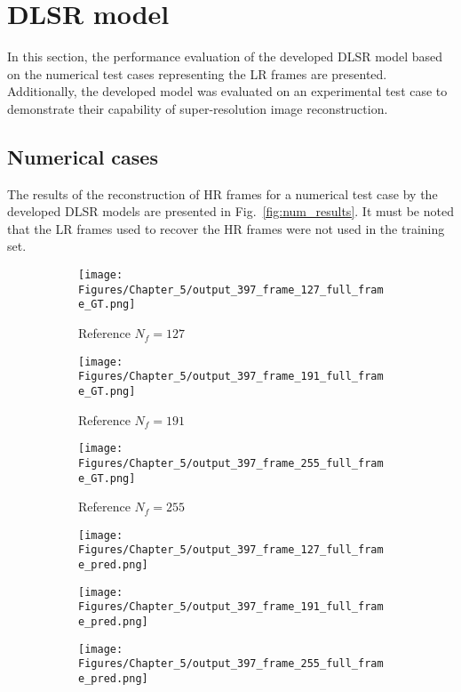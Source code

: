 \section{DLSR model}
\label{sec54}
In this section, the performance evaluation of the developed DLSR model based on the numerical test cases representing the LR frames are presented.
Additionally, the developed model was evaluated on an experimental test case to demonstrate their capability of super-resolution image reconstruction.

\subsection{Numerical cases}
\label{sec541}
The results of the reconstruction of HR frames for a numerical test case by the developed DLSR models are presented in Fig.~\ref{fig:num_results}.
It must be noted that the LR frames used to recover the HR frames were not used in the training set.



\begin{figure} [!ht]
	\centering
	\begin{subfigure}[b]{.32\textwidth}
		\centering
		\texttt{[image: Figures/Chapter\_5/output\_397\_frame\_127\_full\_frame\_GT.png]}
		\caption{Reference $N_f=127$}
		\label{fig:ref_397_full_127}
	\end{subfigure}
	\hfill
	\begin{subfigure}[b]{.32\textwidth}
		\centering
		\texttt{[image: Figures/Chapter\_5/output\_397\_frame\_191\_full\_frame\_GT.png]}
		\caption{Reference $N_f=191$}
		\label{fig:ref_397_full_191}
	\end{subfigure}
	\hfill
	\begin{subfigure}[b]{.32\textwidth}
		\centering
		\texttt{[image: Figures/Chapter\_5/output\_397\_frame\_255\_full\_frame\_GT.png]}
		\caption{Reference $N_f=255$}
		\label{fig:ref_397_full_255}	
	\end{subfigure}
	\hfill
		\begin{subfigure}[b]{.32\textwidth}
		\centering
		\texttt{[image: Figures/Chapter\_5/output\_397\_frame\_127\_full\_frame\_pred.png]}
		\caption{}
		\label{fig:pred_397_full_127}
	\end{subfigure}
	\hfill
	\begin{subfigure}[b]{.32\textwidth}
		\centering
		\texttt{[image: Figures/Chapter\_5/output\_397\_frame\_191\_full\_frame\_pred.png]}
		\caption{}
		\label{fig:pred_397_full_191}
	\end{subfigure}
	\hfill
	\begin{subfigure}[b]{.32\textwidth}
		\centering
		\texttt{[image: Figures/Chapter\_5/output\_397\_frame\_255\_full\_frame\_pred.png]}
		\caption{}
		\label{fig:pred_397_full_255}	
	\end{subfigure}
	\caption{}
	\label{fig:num_results_CS_397}
\end{figure}

